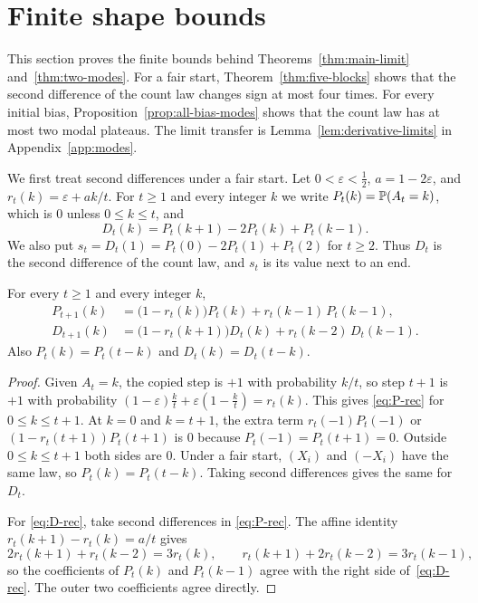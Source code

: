 \section{Finite shape bounds}\label{sec:convex}

This section proves the finite bounds behind
Theorems~\ref{thm:main-limit} and~\ref{thm:two-modes}. For a fair
start, Theorem~\ref{thm:five-blocks} shows that the second
difference of the count law changes sign at most four times. For
every initial bias, Proposition~\ref{prop:all-bias-modes} shows
that the count law has at most two modal plateaus. The limit
transfer is Lemma~\ref{lem:derivative-limits} in
Appendix~\ref{app:modes}.

We first treat second differences under a fair start. Let
$0<\varepsilon<\frac12$, $a=1-2\varepsilon$, and $r_t(k)=\varepsilon+ak/t$. For $t\ge1$ and every integer $k$ we write
$P_t(k)=\mathbb{P}(A_t=k)$, which is $0$ unless $0\le k\le t$, and
\[
 D_t(k)=P_t(k+1)-2P_t(k)+P_t(k-1).
\]
We also put $s_t=D_t(1)=P_t(0)-2P_t(1)+P_t(2)$ for $t\ge2$. Thus $D_t$ is the second difference of the count law, and $s_t$ is
its value next to an end.

\begin{lemma}\label{lem:D-rec}
For every $t\ge1$ and every integer $k$,
\begin{align}
 P_{t+1}(k)&=\bigl(1-r_t(k)\bigr)P_t(k)+r_t(k-1)\,P_t(k-1),\label{eq:P-rec}\\
 D_{t+1}(k)&=\bigl(1-r_t(k+1)\bigr)D_t(k)+r_t(k-2)\,D_t(k-1).\label{eq:D-rec}
\end{align}
Also $P_t(k)=P_t(t-k)$ and $D_t(k)=D_t(t-k)$.
\end{lemma}

\begin{proof}
Given $A_t=k$, the copied step is $+1$ with probability $k/t$, so step $t+1$
is $+1$ with probability $(1-\varepsilon)\frac kt+\varepsilon(1-\frac
kt)=r_t(k)$. This gives \eqref{eq:P-rec} for $0\le k\le t+1$. At $k=0$ and
$k=t+1$, the extra term $r_t(-1)P_t(-1)$ or
$(1-r_t(t+1))P_t(t+1)$ is $0$ because $P_t(-1)=P_t(t+1)=0$.
Outside $0\le k\le t+1$ both sides are $0$.
Under a fair start, $(X_i)$ and $(-X_i)$ have the same law, so
$P_t(k)=P_t(t-k)$. Taking second differences gives the same for $D_t$.

For \eqref{eq:D-rec}, take second differences in \eqref{eq:P-rec}.
The affine identity $r_t(k+1)-r_t(k)=a/t$ gives
\[
 2r_t(k+1)+r_t(k-2)=3r_t(k),\qquad
 r_t(k+1)+2r_t(k-2)=3r_t(k-1),
\]
so the coefficients of $P_t(k)$ and $P_t(k-1)$ agree with the
right side of~\eqref{eq:D-rec}. The outer two coefficients agree directly.
\end{proof}

